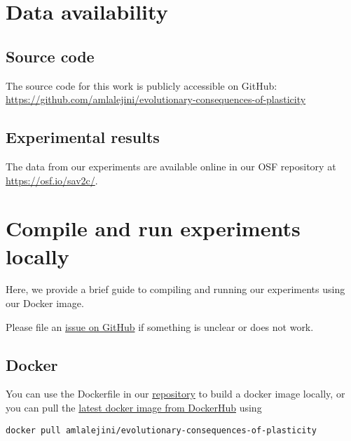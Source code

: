 \documentclass[]{book}
\begin{document}
\hypertarget{data-availability}{%
\chapter{Data availability}\label{data-availability}}

\hypertarget{source-code}{%
\section{Source code}\label{source-code}}

The source code for this work is publicly accessible on GitHub: \url{https://github.com/amlalejini/evolutionary-consequences-of-plasticity}

\hypertarget{experimental-results}{%
\section{Experimental results}\label{experimental-results}}

The data from our experiments are available online in our OSF repository \citep{osf_data} at \url{https://osf.io/sav2c/}.

\hypertarget{compile-and-run-experiments-locally}{%
\chapter{Compile and run experiments locally}\label{compile-and-run-experiments-locally}}

Here, we provide a brief guide to compiling and running our experiments using our Docker image.

Please file an \href{https://github.com/amlalejini/evolutionary-consequences-of-plasticity}{issue on GitHub} if something is unclear or does not work.

\hypertarget{docker}{%
\section{Docker}\label{docker}}

You can use the Dockerfile in our \href{https://github.com/amlalejini/evolutionary-consequences-of-plasticity}{repository} to build a docker image locally, or you can pull the \href{https://hub.docker.com/r/amlalejini/evolutionary-consequences-of-plasticity}{latest docker image from DockerHub} using

\begin{verbatim}
docker pull amlalejini/evolutionary-consequences-of-plasticity
\end{verbatim}
\end{document}
